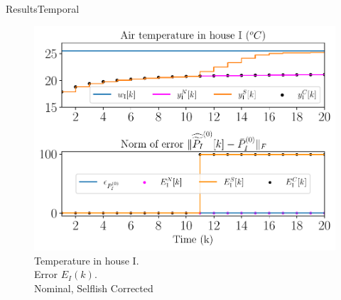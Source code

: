 \documentclass[aspectratio=169]{beamer}
\begin{document}
\begin{frame}{Results}{Temporal}
  \centering
  \begin{overlayarea}{1\textwidth}{.5\textwidth}
  \begin{figure}[h]
    \centering
    \includegraphics[width=.45\textwidth,trim=0 .3cm 0 .2cm,clip]{../img/resilient_ineq/ErrorWX_command_normErrH.pdf}
    \caption*{Temperature in house I. \\Error  $E_{I}(k)$.\\ {} Nominal, {} Selflish {} Corrected}
  \end{figure}


  \end{overlayarea}

\end{frame}

\end{document}
